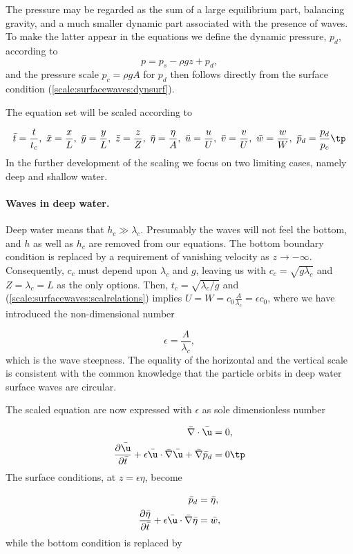 \documentclass[graybox,envcountchap,sectrefs,final]{svmonodo}
\begin{document}
The pressure may be regarded as the sum of a large equilibrium part, balancing
gravity, and a much smaller dynamic part associated with the presence of
waves. To make the latter appear in the equations we define the
dynamic pressure, $p_d$, according to
\[ p=p_s-\rho g z +p_d,\]
and the pressure scale $p_c=\rho g A$ for $p_d$ then follows directly from
the surface condition (\ref{scale:surfacewaves:dynsurf}).

The equation set will be scaled according to

\[
\bar t=\frac{t}{t_c},\ \bar x=\frac{x}{L},\ \bar y =\frac{y}{L},\ \bar z =\frac{z}{Z},\ \bar \eta=\frac{\eta}{A},\ \bar u=\frac{u}{U},\ \bar v=\frac{v}{U},\ \bar w=\frac{w}{W},\ \bar p_d=\frac{p_d}{p_c}\tp
\]
In the further development of the scaling
we focus on two limiting cases, namely deep and shallow water.

\paragraph{Waves in deep  water.}
Deep water means that $h_c\gg\lambda_c$. Presumably the waves will not
feel the bottom, and $h$ as well as $h_c$ are removed from our
equations. The bottom boundary condition is replaced by a requirement
of vanishing velocity as $z\rightarrow -\infty$. Consequently, $c_c$
must depend upon $\lambda_c$ and $g$, leaving us with
$c_c=\sqrt{g\lambda_c}$ and $Z=\lambda_c=L$ as the only options.
Then, $t_c=\sqrt{\lambda_c/g}$ and
(\ref{scale:surfacewaves:scalrelations}) implies
$U=W=c_0\frac{A}{\lambda_c}=\epsilon c_0$, where we have introduced
the non-dimensional number

\[\epsilon=\frac{A}{\lambda_c},\]
which is the wave steepness. The equality of the horizontal and the vertical
scale is consistent with the common knowledge that the particle orbits in
deep water surface waves are circular.

The scaled equation are now expressed with $\epsilon$ as sole dimensionless
number

\begin{align}
\bar \nabla\cdot\bar\u &=0,
\label{scale:surfacewaves:cont:}\\ 
\frac{\partial\bar\u}{\partial \bar t} + \epsilon\bar \u\cdot\bar\nabla\bar\u + \bar\nabla \bar p_d&=0\tp
\label{scale:surfacewave:u:s}
\end{align}
The surface conditions, at $z=\epsilon \eta$, become

\begin{align}
\bar p_d &=\bar \eta,
\label{scale:surfacewaves:dynsurf:s}\\ 
\frac{\partial\bar\eta}{\partial \bar t} + \epsilon \bar \u\cdot\bar\nabla\bar\eta &=\bar w,
\label{scale:surfacewave:kinsurf:s}
\end{align}
while the bottom condition is replaced by
\end{document}
